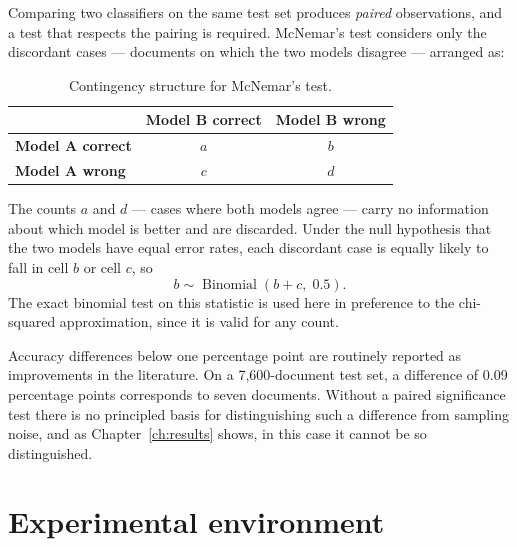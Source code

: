 Comparing two classifiers on the same test set produces \emph{paired} observations, and a test
that respects the pairing is required. McNemar's test \cite{mcnemar1947} considers only the
discordant cases --- documents on which the two models disagree --- arranged as:

\begin{table}[ht]
\centering
\caption{Contingency structure for McNemar's test.}
\label{tab:mcnemar_structure}
\begin{tabular}{lcc}
\toprule
 & \textbf{Model B correct} & \textbf{Model B wrong} \\
\midrule
\textbf{Model A correct} & $a$ & $b$ \\
\textbf{Model A wrong}   & $c$ & $d$ \\
\bottomrule
\end{tabular}
\end{table}

The counts $a$ and $d$ --- cases where both models agree --- carry no information about which model
is better and are discarded. Under the null hypothesis that the two models have equal error rates,
each discordant case is equally likely to fall in cell $b$ or cell $c$, so
\begin{equation}
b \sim \operatorname{Binomial}(b + c,\; 0.5).
\end{equation}
The exact binomial test on this statistic is used here in preference to the chi-squared
approximation, since it is valid for any count.

 Accuracy differences below one percentage point are routinely reported
as improvements in the literature. On a 7{,}600-document test set, a difference of 0.09 percentage
points corresponds to seven documents. Without a paired significance test there is no principled
basis for distinguishing such a difference from sampling noise, and as Chapter~\ref{ch:results}
shows, in this case it cannot be so distinguished.

\section{Experimental environment}

